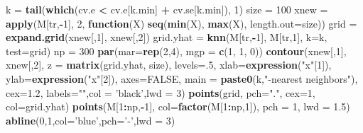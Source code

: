 \documentclass[]{article}
\newenvironment{Shaded}{\begin{snugshade}}{\end{snugshade}}
\newcommand{\KeywordTok}[1]{\textcolor[rgb]{0.13,0.29,0.53}{\textbf{#1}}}
\newcommand{\DataTypeTok}[1]{\textcolor[rgb]{0.13,0.29,0.53}{#1}}
\newcommand{\DecValTok}[1]{\textcolor[rgb]{0.00,0.00,0.81}{#1}}
\newcommand{\FloatTok}[1]{\textcolor[rgb]{0.00,0.00,0.81}{#1}}
\newcommand{\StringTok}[1]{\textcolor[rgb]{0.31,0.60,0.02}{#1}}
\newcommand{\OtherTok}[1]{\textcolor[rgb]{0.56,0.35,0.01}{#1}}
\newcommand{\ControlFlowTok}[1]{\textcolor[rgb]{0.13,0.29,0.53}{\textbf{#1}}}
\newcommand{\OperatorTok}[1]{\textcolor[rgb]{0.81,0.36,0.00}{\textbf{#1}}}
\newcommand{\NormalTok}[1]{#1}
\begin{document}
\begin{Shaded}
\begin{Highlighting}[]
\NormalTok{k =}\StringTok{ }\KeywordTok{tail}\NormalTok{(}\KeywordTok{which}\NormalTok{(cv.e }\OperatorTok{<}\StringTok{ }\NormalTok{cv.e[k.min] }\OperatorTok{+}\StringTok{ }\NormalTok{cv.se[k.min]), }\DecValTok{1}\NormalTok{)}
\NormalTok{size =}\StringTok{ }\DecValTok{100}
\NormalTok{xnew =}\StringTok{ }\KeywordTok{apply}\NormalTok{(M[tr,}\OperatorTok{-}\DecValTok{1}\NormalTok{], }\DecValTok{2}\NormalTok{, }\ControlFlowTok{function}\NormalTok{(X) }\KeywordTok{seq}\NormalTok{(}\KeywordTok{min}\NormalTok{(X), }\KeywordTok{max}\NormalTok{(X), }\DataTypeTok{length.out=}\NormalTok{size))}
\NormalTok{grid =}\StringTok{ }\KeywordTok{expand.grid}\NormalTok{(xnew[,}\DecValTok{1}\NormalTok{], xnew[,}\DecValTok{2}\NormalTok{])}
\NormalTok{grid.yhat =}\StringTok{ }\KeywordTok{knn}\NormalTok{(M[tr,}\OperatorTok{-}\DecValTok{1}\NormalTok{], M[tr,}\DecValTok{1}\NormalTok{], }\DataTypeTok{k=}\NormalTok{k, }\DataTypeTok{test=}\NormalTok{grid)}
\NormalTok{np =}\StringTok{ }\DecValTok{300}
\KeywordTok{par}\NormalTok{(}\DataTypeTok{mar=}\KeywordTok{rep}\NormalTok{(}\DecValTok{2}\NormalTok{,}\DecValTok{4}\NormalTok{), }\DataTypeTok{mgp =} \KeywordTok{c}\NormalTok{(}\DecValTok{1}\NormalTok{, }\DecValTok{1}\NormalTok{, }\DecValTok{0}\NormalTok{))}
\KeywordTok{contour}\NormalTok{(xnew[,}\DecValTok{1}\NormalTok{], xnew[,}\DecValTok{2}\NormalTok{], }\DataTypeTok{z =} \KeywordTok{matrix}\NormalTok{(grid.yhat, size), }\DataTypeTok{levels=}\NormalTok{.}\DecValTok{5}\NormalTok{, }
        \DataTypeTok{xlab=}\KeywordTok{expression}\NormalTok{(}\StringTok{"x"}\NormalTok{[}\DecValTok{1}\NormalTok{]), }\DataTypeTok{ylab=}\KeywordTok{expression}\NormalTok{(}\StringTok{"x"}\NormalTok{[}\DecValTok{2}\NormalTok{]), }\DataTypeTok{axes=}\OtherTok{FALSE}\NormalTok{,}
        \DataTypeTok{main =} \KeywordTok{paste0}\NormalTok{(k,}\StringTok{"-nearest neighbors"}\NormalTok{), }\DataTypeTok{cex=}\FloatTok{1.2}\NormalTok{, }\DataTypeTok{labels=}\StringTok{""}\NormalTok{,}\DataTypeTok{col =} \StringTok{'black'}\NormalTok{,}\DataTypeTok{lwd =} \DecValTok{3}\NormalTok{)}
\KeywordTok{points}\NormalTok{(grid, }\DataTypeTok{pch=}\StringTok{"."}\NormalTok{, }\DataTypeTok{cex=}\DecValTok{1}\NormalTok{, }\DataTypeTok{col=}\NormalTok{grid.yhat)}
\KeywordTok{points}\NormalTok{(M[}\DecValTok{1}\OperatorTok{:}\NormalTok{np,}\OperatorTok{-}\DecValTok{1}\NormalTok{], }\DataTypeTok{col=}\KeywordTok{factor}\NormalTok{(M[}\DecValTok{1}\OperatorTok{:}\NormalTok{np,}\DecValTok{1}\NormalTok{]), }\DataTypeTok{pch =} \DecValTok{1}\NormalTok{, }\DataTypeTok{lwd =} \FloatTok{1.5}\NormalTok{)}
\KeywordTok{abline}\NormalTok{(}\DecValTok{0}\NormalTok{,}\DecValTok{1}\NormalTok{,}\DataTypeTok{col=}\StringTok{'blue'}\NormalTok{,}\DataTypeTok{pch=}\StringTok{'-'}\NormalTok{,}\DataTypeTok{lwd =} \DecValTok{3}\NormalTok{)}


\end{Highlighting}
\end{Shaded}
\end{document}
